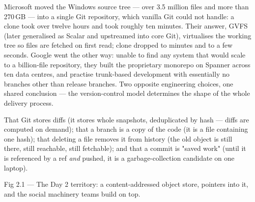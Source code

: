  Microsoft moved the Windows source tree --- over 3.5 million files and more than 270\,GB --- into a single Git repository, which vanilla Git could not handle: a clone took over twelve hours and  took roughly ten minutes. Their answer, GVFS (later generalised as Scalar and upstreamed into core Git), virtualises the working tree so files are fetched on first read; clone dropped to minutes and  to a few seconds. Google went the other way: unable to find any system that would scale to a billion-file repository, they built the proprietary  monorepo on Spanner across ten data centres, and practise trunk-based development with essentially no branches other than release branches. Two opposite engineering choices, one shared conclusion --- the version-control model determines the shape of the whole delivery process.

 That Git stores diffs (it stores whole snapshots, deduplicated by hash --- diffs are computed on demand); that a branch is a copy of the code (it is a file containing one hash); that deleting a file removes it from history (the old object is still there, still reachable, still fetchable); and that a commit is "saved work" (until it is referenced by a ref \emph{and} pushed, it is a garbage-collection candidate on one laptop).


\begin{wbfigure}{Fig 2.1 — The Day 2 territory: a content-addressed object store, pointers into it, and the social machinery teams build on top.}
\end{wbfigure}

